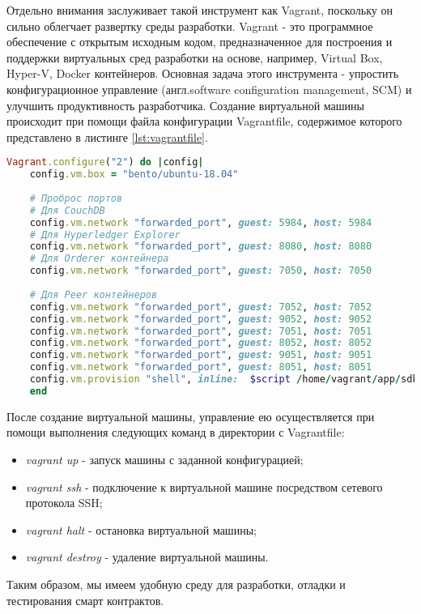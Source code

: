 Отдельно внимания заслуживает такой инструмент как Vagrant, поскольку он сильно облегчает развертку среды разработки. 
Vagrant - это программное обеспечение с открытым исходным кодом, предназначенное для построения и поддержки виртуальных сред разработки на основе, например, Virtual Box, Hyper-V, Docker контейнеров. Основная задача этого инструмента - упростить конфигурационное управление (англ.software configuration management, SCM) \cite{scm} и улучшить продуктивность разработчика. 
Создание виртуальной машины происходит при помощи файла конфигурации Vagrantfile, содержимое которого представлено в листинге \ref{lst:vagrantfile}.

\begin{lstlisting}[caption={Конфигурация виртуальной машины: Vagrantfile},label={lst:vagrantfile},language=Ruby]
	Vagrant.configure("2") do |config|
	config.vm.box = "bento/ubuntu-18.04"
	
	# Проброс портов
	# Для CouchDB
	config.vm.network "forwarded_port", guest: 5984, host: 5984
	# Для Hyperledger Explorer
	config.vm.network "forwarded_port", guest: 8080, host: 8080
	# Для Orderer контейнера
	config.vm.network "forwarded_port", guest: 7050, host: 7050
	
	# Для Peer контейнеров
	config.vm.network "forwarded_port", guest: 7052, host: 7052
	config.vm.network "forwarded_port", guest: 9052, host: 9052
	config.vm.network "forwarded_port", guest: 7051, host: 7051
	config.vm.network "forwarded_port", guest: 8052, host: 8052
	config.vm.network "forwarded_port", guest: 9051, host: 9051
	config.vm.network "forwarded_port", guest: 8051, host: 8051
	config.vm.provision "shell", inline:  $script /home/vagrant/app/sdk/vagrant_node_modules
	end
\end{lstlisting}


После создание виртуальной машины, управление ею осуществляется при помощи выполнения следующих команд в директории с Vagrantfile:
\begin{itemize}
	\item \textit{vagrant up} - запуск машины с заданной конфигурацией;
	\item \textit{vagrant ssh} - подключение к виртуальной машине посредством сетевого протокола SSH;
	\item \textit{vagrant halt} - остановка виртуальной машины;
	\item \textit{vagrant destroy} - удаление виртуальной машины.
\end{itemize}
Таким образом, мы имеем удобную среду для разработки, отладки и тестирования смарт контрактов.


